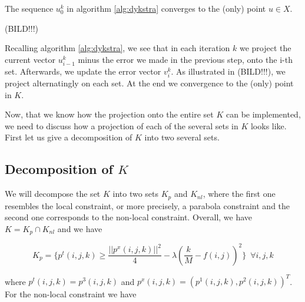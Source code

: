         \begin{proposition}
            The sequence $u_{0}^{k}$ in algorithm \ref{alg:dykstra} converges to the (only) point $u \in X$.
        \end{proposition}

        (BILD!!!)

        Recalling algorithm \ref{alg:dykstra}, we see that in each iteration $k$ we project the current vector $u_{i-1}^{k}$ minus the error we made in the previous step, onto the i-th set. Afterwards, we update the error vector $v_{i}^{k}$. As illustrated in (BILD!!!), we project alternatingly on each set. At the end we convergence to the (only) point in $K$.

        Now, that we know how the projection onto the entire set $K$ can be implemented, we need to discuss how a projection of each of the several sets in $K$ looks like. First let us give a decomposition of $K$ into two several sets.

    \subsection{Decomposition of $K$} %
    \label{sub:decomposition_of_K}
        
        We will decompose the set $K$ into two sets $K_{p}$ and $K_{nl}$, where the first one resembles the local constraint, or more precisely, a parabola constraint and the second one corresponds to the non-local constraint. Overall, we have $K = K_{p} \cap K_{nl}$ and we have        

    \begin{equation}
        K_{p} = \bigg\{ p^{t}(i, j, k) \ge \frac{||p^{x}(i, j, k)||^{2}}{4} - \lambda(\frac{k}{M} - f(i,j))^{2} \bigg\} \,\,\, \forall i, j, k \label{eq:parabola}
    \end{equation}

    where $p^{t}(i, j, k) = p^{3}(i, j, k)$ and $p^{x}(i, j, k) = (p^{1}(i, j, k), p^{2}(i, j, k))^{T}$. For the non-local constraint we have

